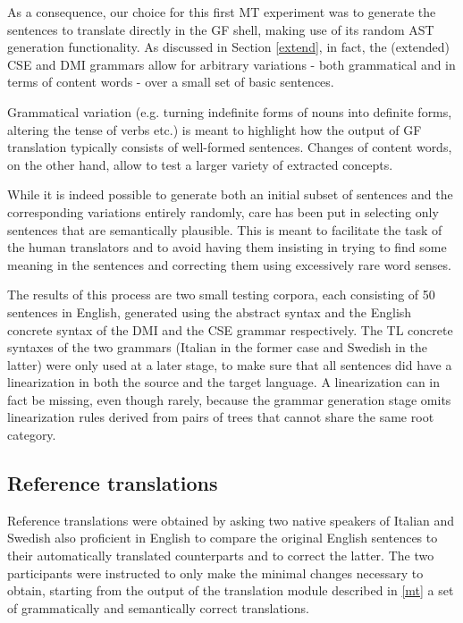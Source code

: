 As a consequence, our choice for this first MT experiment was to generate the sentences to translate directly in the GF shell, making use of its random AST generation functionality. As discussed in Section \ref{extend}, in fact, the (extended) CSE and DMI grammars allow for arbitrary variations - both grammatical and in terms of content words - over a small set of basic sentences. \smallskip

Grammatical variation (e.g. turning indefinite forms of nouns into definite forms, altering the tense of verbs etc.) is meant to highlight how the output of GF translation typically consists of well-formed sentences. Changes of content words, on the other hand, allow to test a larger variety of extracted concepts. \smallskip

While it is indeed possible to generate both an initial subset of sentences and the corresponding variations entirely randomly, care has been put in selecting only sentences that are semantically plausible. This is meant to facilitate the task of the human translators and to avoid having them insisting in trying to find some meaning in the sentences and correcting them using excessively rare word senses. \smallskip

The results of this process are two small testing corpora, each consisting of 50 sentences in English, generated using the abstract syntax and the English concrete syntax of the DMI and the CSE grammar respectively. 
The TL concrete syntaxes of the two grammars (Italian in the former case and Swedish in the latter) were only used at a later stage, to make sure that all sentences did have a linearization in both the source and the target language. 
A linearization can in fact be missing, even though rarely, because the grammar generation stage omits linearization rules derived from pairs of trees that cannot share the same root category.

\subsection{Reference translations} \label{ref}
Reference translations were obtained by asking two native speakers of Italian and Swedish also proficient in English to compare the original English sentences to their automatically translated counterparts and to correct the latter.
The two participants were instructed to only make the minimal changes necessary to obtain, starting from the output of the translation module described in \ref{mt} a set of grammatically and semantically correct translations. \smallskip

